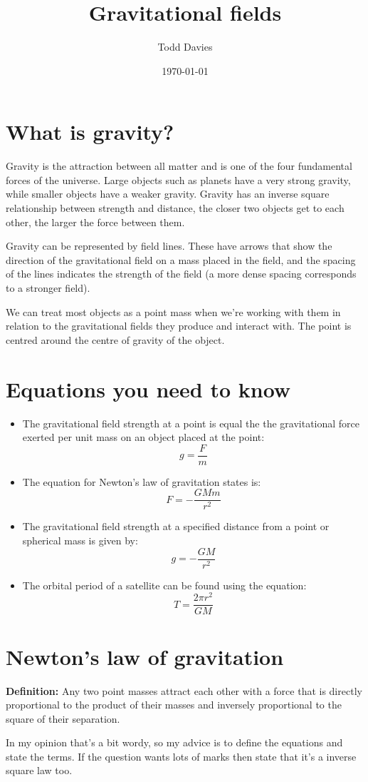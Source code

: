\documentclass{article}
\title{Gravitational fields}
\author{Todd Davies}
\date{\today}
\begin{document}
\lhead{\today}
\setlength{\parindent}{0cm}

\maketitle

\section*{What is gravity?}
\thispagestyle{empty}
Gravity is the attraction between all matter and is one of the four fundamental forces of the universe. Large objects such as planets have a very strong gravity, while smaller objects have a weaker gravity. Gravity has an inverse square relationship between strength and distance, the closer two objects get to each other, the larger the force between them.

Gravity can be represented by field lines. These have arrows that show the direction of the gravitational field on a mass placed in the field, and the spacing of the lines indicates the strength of the field (a more dense spacing corresponds to a stronger field).

We can treat most objects as a point mass when we're working with them in relation to the gravitational fields they produce and interact with. The point is centred around the centre of gravity of the object.


\section*{Equations you need to know}

\begin{itemize}
	\item The gravitational field strength at a point is equal the the gravitational force exerted per unit mass on an object placed at the point:
	\[
		g = \frac{F}{m}
	\]
	\item The equation for Newton's law of gravitation states is:
	\[
		F = -\frac{GMm}{r^2}
	\]
	\item The gravitational field strength at a specified distance from a point or spherical mass is given by:
	\[
		g = -\frac{GM}{r^2}
	\]
	\item The orbital period of a satellite can be found using the equation:
	\[
		T = \frac{2 \pi r^2}{GM}
	\]
\end{itemize}


\section*{Newton's law of gravitation}
\textbf{Definition:} Any two point masses attract each other with a force that is directly proportional to the product of their masses and inversely proportional to the square of their separation.

In my opinion that's a bit wordy, so my advice is to define the equations and state the terms. If the question wants lots of marks then state that it's a inverse square law too.
\end{document}
